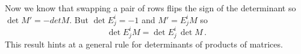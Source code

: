 
Now we know that swapping a pair of rows flips the sign of the determinant so $\det M'=-det M$.
But $\det E_j^i=-1$ and $M'=E^i_j M$ so 
\[
\det E^i_j M = \det E^i_j \, \det M\, .
\]
This result hints at a general rule for determinants of products of matrices. 


%

%



